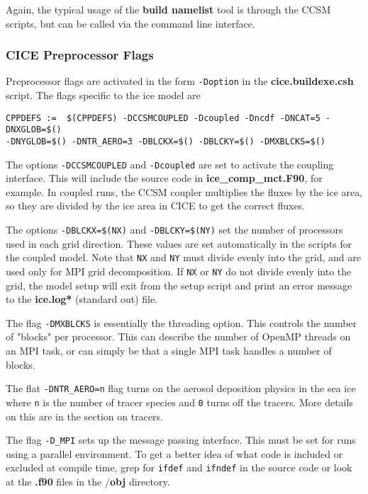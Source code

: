 Again, the typical usage of the \textbf{build namelist} tool is through
the CCSM scripts, but can be called via the command line interface.

\subsubsection{CICE Preprocessor Flags}

Preprocessor flags are activated in the form {\tt -Doption} in the 
{\bf cice.buildexe.csh} script.  The flags specific to the ice model are

\begin{verbatim}
CPPDEFS :=  $(CPPDEFS) -DCCSMCOUPLED -Dcoupled -Dncdf -DNCAT=5 -DNXGLOB=$()
-DNYGLOB=$() -DNTR_AERO=3 -DBLCKX=$() -DBLCKY=$() -DMXBLCKS=$()
\end{verbatim}

The options {\tt -DCCSMCOUPLED} and  {\tt -Dcoupled} are set to activate the 
coupling interface.  This will include the source code in 
{\bf ice\_comp\_mct.F90}, for example.  In coupled runs, the CCSM coupler 
multiplies the fluxes by the ice area, so they are divided by the ice area 
in CICE to get the correct fluxes.

The options {\tt -DBLCKX=\$(NX)} and {\tt -DBLCKY=\$(NY)} set the number of
processors used in each grid direction.  These values are set automatically
in the scripts for the coupled model.  Note that {\tt NX} and {\tt NY} must 
divide evenly into the grid, and are used only for MPI grid decomposition.  
If {\tt NX} or {\tt NY} do not divide evenly into the grid, the model setup 
will exit from the setup script and print an error message to the 
{\bf ice.log*} (standard out) file.

The flag {\tt -DMXBLCKS} is essentially the threading option. This controls
the number of "blocks" per processor. This can describe the number of OpenMP
threads on an MPI task, or can simply be that a single MPI task handles
a number of blocks.

The flat {\tt -DNTR\_AERO=n} flag turns on the aerosol deposition physics in
the sea ice where {\tt n} is the number of tracer species and {\tt 0} turns
off the tracers. More details on this are in the section on tracers. 

The flag {\tt -D\_MPI} sets up the message passing interface.  This must be set
for runs using a parallel environment.  To get a better idea of what code
is included or excluded at compile time, grep for {\tt ifdef} and {\tt ifndef}
in the source code or look at the {\bf *.f90} files in the /{\bf obj} directory.

